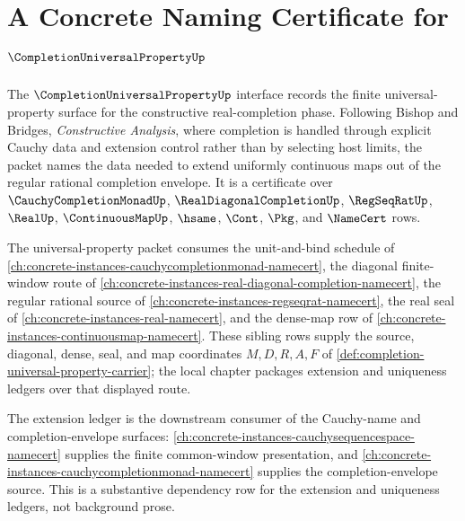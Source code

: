 \chapter{A Concrete Naming Certificate for $\CompletionUniversalPropertyUp$}
\label{ch:concrete-instances-completionuniversalproperty-namecert}

The $\CompletionUniversalPropertyUp$ interface records the finite universal-property surface for the constructive real-completion phase. Following Bishop and Bridges, \emph{Constructive Analysis}, where completion is handled through explicit Cauchy data and extension control rather than by selecting host limits, the packet names the data needed to extend uniformly continuous maps out of the regular rational completion envelope. It is a certificate over $\CauchyCompletionMonadUp$, $\RealDiagonalCompletionUp$, $\RegSeqRatUp$, $\RealUp$, $\ContinuousMapUp$, $\hsame$, $\Cont$, $\Pkg$, and $\NameCert$ rows.

The universal-property packet consumes the unit-and-bind schedule of \autoref{ch:concrete-instances-cauchycompletionmonad-namecert}, the diagonal finite-window route of \autoref{ch:concrete-instances-real-diagonal-completion-namecert}, the regular rational source of \autoref{ch:concrete-instances-regseqrat-namecert}, the real seal of \autoref{ch:concrete-instances-real-namecert}, and the dense-map row of \autoref{ch:concrete-instances-continuousmap-namecert}. These sibling rows supply the source, diagonal, dense, seal, and map coordinates $M,D,R,A,F$ of \autoref{def:completion-universal-property-carrier}; the local chapter packages extension and uniqueness ledgers over that displayed route.

The extension ledger is the downstream consumer of the Cauchy-name and completion-envelope surfaces: \autoref{ch:concrete-instances-cauchysequencespace-namecert} supplies the finite common-window presentation, and \autoref{ch:concrete-instances-cauchycompletionmonad-namecert} supplies the completion-envelope source. This is a substantive dependency row for the extension and uniqueness ledgers, not background prose.

